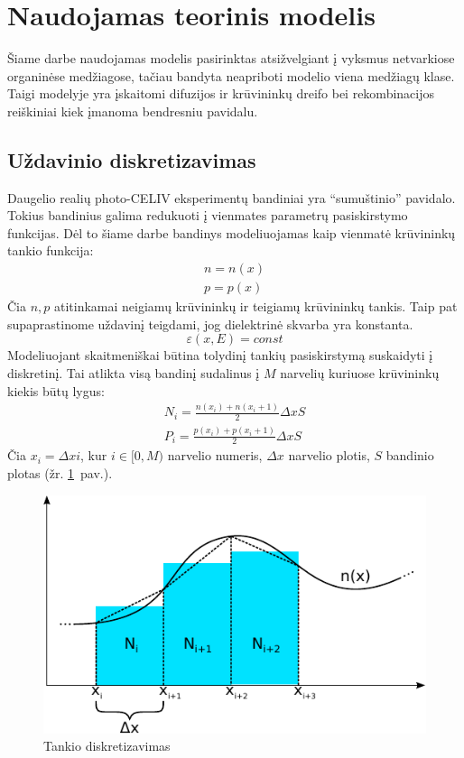 
\section{Naudojamas teorinis modelis}

Šiame darbe naudojamas modelis pasirinktas atsižvelgiant į vyksmus netvarkiose organinėse medžiagose, tačiau bandyta neapriboti modelio viena medžiagų klase. Taigi modelyje yra įskaitomi difuzijos ir krūvininkų dreifo bei rekombinacijos reiškiniai kiek įmanoma bendresniu pavidalu. 

\subsection{Uždavinio diskretizavimas}

Daugelio realių photo-CELIV eksperimentų bandiniai yra “sumuštinio” pavidalo. Tokius bandinius galima redukuoti į vienmates parametrų pasiskirstymo funkcijas. Dėl to šiame darbe bandinys modeliuojamas kaip vienmatė krūvininkų tankio funkcija:
\begin{equation}
\begin{array}{c}
n=n(x)\\
p=p(x)
\end{array}
\end{equation}
Čia \(n,p\) atitinkamai neigiamų krūvininkų ir teigiamų krūvininkų tankis. Taip pat supaprastinome uždavinį teigdami, jog dielektrinė skvarba yra konstanta.
\begin{equation}
\varepsilon(x,E)=\textit{const}
\end{equation}
Modeliuojant skaitmeniškai būtina tolydinį tankių pasiskirstymą suskaidyti į diskretinį. Tai atlikta visą bandinį sudalinus į \(M\) narvelių kuriuose krūvininkų kiekis būtų lygus:
\begin{equation}
\begin{array}{c}
N_i = \frac { n(x_i) + n(x_i+1)}{2} \Delta x S\\
P_i = \frac { p(x_i) + p(x_i+1)}{2} \Delta x S
\end{array}
\end{equation}
Čia \(x_i= \Delta x i\), kur \(i \in [0,M)\) narvelio numeris, \(\Delta x\) narvelio plotis, \(S\) bandinio plotas (žr. \ref{fig:diskretizavimas}~pav.).
\begin{figure}
  \centering
    \includegraphics[scale=0.9]{./media/pdf/il1}
  \caption{Tankio diskretizavimas}
  \label{fig:diskretizavimas}
\end{figure}

